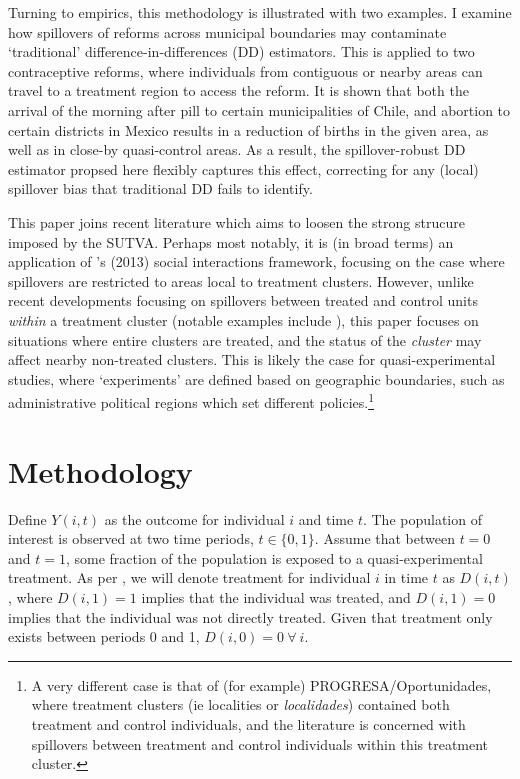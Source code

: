 \documentclass{article}
\begin{document}
\begin{spacing}{1.3}
Turning to empirics, this methodology is illustrated with two examples.
I examine how spillovers of reforms across municipal boundaries may 
contaminate `traditional' difference-in-differences (DD) estimators.  This is 
applied to two contraceptive reforms, where individuals from contiguous or nearby 
areas can travel to a treatment region to access the reform.  It is shown that 
both the arrival of the morning after pill to certain municipalities of Chile, 
and abortion to certain districts in Mexico results in a reduction of births in 
the given area, as well as in close-by quasi-control areas.  As a result, the 
spillover-robust DD estimator propsed here flexibly captures this effect, 
correcting for any (local) spillover bias that traditional DD fails to 
identify.

This paper joins recent literature which aims to loosen the strong strucure 
imposed by the SUTVA.  Perhaps most notably, it is (in broad terms) an 
application of \citeauthor{Manski2013}'s (2013) social interactions framework, 
focusing on the case where spillovers are restricted to areas local to treatment 
clusters.  However, unlike recent developments focusing on spillovers 
between treated and control units \emph{within} a treatment cluster (notable
examples include \citet{McIntosh2008,Bairdetal2014,AngelucciDiMaro2010}), this 
paper focuses on situations where entire clusters are treated, and the status
of the \emph{cluster} may affect nearby non-treated clusters.  This is likely
the case for quasi-experimental studies, where `experiments' are defined based
on geographic boundaries, such as administrative political regions which set 
different policies.\footnote{A very different case is that of (for example)
PROGRESA/Oportunidades, where treatment clusters (ie localities or 
\emph{localidades}) contained both treatment and control individuals, and the
literature is concerned with spillovers between treatment and control individuals
within this treatment cluster.}

\nocite{AngelucciDeGiorgi2009} \nocite{Heckmanetal1998}
\nocite{MiguelKremer2004}
 \nocite{Heckmanetal1998b}

\section{Methodology}
Define $Y(i,t)$ as the outcome for individual $i$ and time $t$.  The population
of interest is observed at two time periods, $t\in \{0,1\}$. Assume that between
$t=0$ and $t=1$, some fraction of the population is exposed to a 
quasi-experimental treatment.  As per \citet{Abadie2005}, we will denote 
treatment for individual $i$ in time $t$ as $D(i,t)$, where $D(i,1)=1$ implies 
that the individual was treated, and $D(i,1)=0$ implies that the individual was
not directly treated.  Given that treatment only exists between periods 0 and 1,
$D(i,0)=0\ \forall\ i$.


\end{spacing}
\end{document}
